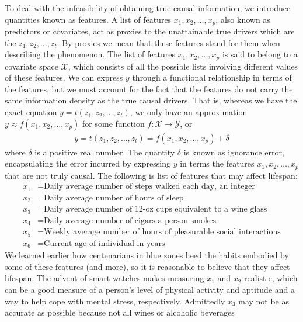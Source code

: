 \documentclass[12pt]{article}
\begin{document}
	To deal with the infeasibility of obtaining true causal information, we
	introduce quantities known as features. A list of features $x_1,x_2,\ldots,x_p$,
	also known as predictors or covariates, act as proxies to the unattainable
	true drivers which are the $z_1,z_2,\ldots,z_t$. By proxies we mean that these
	features stand for them when describing the phenomenon. The list of
	features $x_1,x_2,\ldots,x_p$ is said to belong to a covariate space
	$\mathcal{X}$, which consists of all the possible lists involving different
	values of these features. We can express $y$ through a functional relationship
	in terms of the features, but we must account for the fact that the features
	do not carry the same information density as the true causal drivers.
	That is, whereas we have the exact equation $y=t(z_1,z_2,\ldots,z_t)$,
	we only have an approximation $y\approx f(x_1,x_2,\ldots,x_p)$ for
	some function $f:\mathcal{X}\to\mathcal{Y}$, or
	\begin{align*}
		y = t(z_1,z_2,\ldots,z_t)=f(x_1,x_2,\ldots,x_p) + \delta
	\end{align*}
	where $\delta$ is a positive real number. The quantity $\delta$ is known as ignorance
	error, encapsulating the error incurred by expressing $y$ in terms the
	features $x_1,x_2,\ldots,x_p$ that are not truly causal. The following 
	is list of features that may affect lifespan:
	\begin{align*}
		x_1 &= \text{Daily average number of steps walked each day, an integer}\\
		x_2 &= \text{Daily average number of hours of sleep}\\
		x_3 &= \text{Daily average number of 12-oz cups equivalent to a wine glass}\\
		x_4 &= \text{Daily average number of cigars a person smokes}\\
		x_5 &= \text{Weekly average number of hours of pleasurable social interactions}\\
		x_6 &= \text{Current age of individual in years}
	\end{align*}
	We learned earlier how centenarians in blue zones heed the habits embodied
	by some of these features (and more), so it is reasonable to believe that they affect
	lifespan. The advent of smart watches makes measuring $x_1$ and $x_2$ realistic, which can
	be a good measure of a person's level of physical activity and aptitude and
	a way to help cope with mental stress, respectively. Admittedly $x_3$
	may not be as accurate as possible because not all wines or alcoholic beverages
\end{document}
